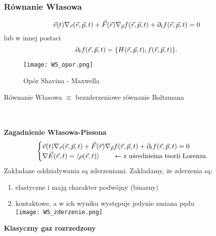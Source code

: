 \subsubsection{Równanie Własowa}
\begin{equation}
\vec{v}(t) \nabla_{\vec{r}} (\vec{r},\vec{p},t) + \vec{F}(\vec{r}) \nabla_{\vec{p}}f(\vec{r},\vec{p},t) +\partial_t f(\vec{r},\vec{p},t) =0
\end{equation}
lub w innej postaci
\begin{equation}
\partial_t f(\vec{r},\vec{p},t) = \{ H(\vec{r},\vec{p},t),f(\vec{r},\vec{p},t)\}.
\end{equation}
\begin{figure}[h!]
\centering
\caption[]{Opór Shavina - Maxwella}
\texttt{[image: W5\_opor.png]}
\end{figure}
\begin{center}
Równanie Własowa $\equiv$ bezzderzeniowe równanie Boltzmana
\end{center}
$ $
\\
\\
\\
\textbf{Zagadnienie Własowa-Pissona}
$$\begin{cases}
\vec{v}(t) \nabla_{\vec{r}} (\vec{r},\vec{p},t) + \vec{F}(\vec{r}) \nabla_{\vec{p}}f(\vec{r},\vec{p},t) +\partial_t f(\vec{r},\vec{p},t) =0&\\
\nabla \vec{E} (\vec{r},t) = \left< \rho (\vec{r},t) \right>  \qquad \leftarrow \mbox{z uśrednieina teorii Lorenza}.& 
\end{cases}$$
Zakładane oddziaływania są zderzeniami. Zakładamy, że zderzenia są:
\begin{enumerate}
\item elastyczne i mają charakter podwójny (binarny)
\item kontaktowe, a w ich wyniku występuje jedynie zmiana pędu\\
\texttt{[image: W5\_zderzenie.png]}
\end{enumerate}
\textbf{Klasyczny gaz rozrzedzony}

